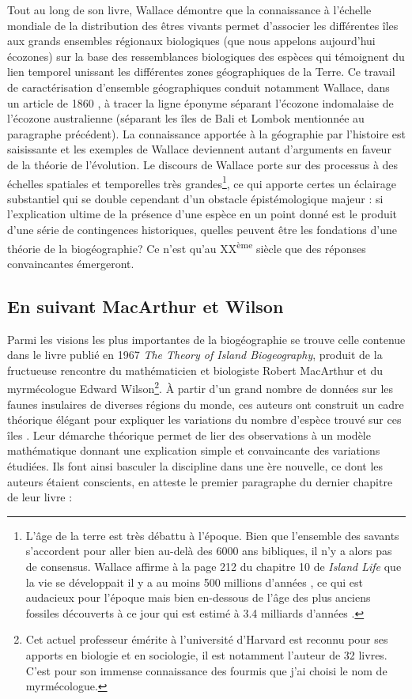 Tout au long de son livre, Wallace démontre que la connaissance à
l'échelle mondiale de la distribution des êtres vivants permet
d'associer les différentes îles aux grands ensembles régionaux
biologiques (que nous appelons aujourd'hui écozones) sur la base des
ressemblances biologiques des espèces qui témoignent du lien temporel
unissant les différentes zones géographiques de la Terre. Ce travail de
caractérisation d'ensemble géographiques conduit notamment Wallace, dans
un article de 1860 \citep{Wallace1860}, à tracer la ligne éponyme
séparant l'écozone indomalaise de l'écozone australienne (séparant les
îles de Bali et Lombok mentionnée au paragraphe précédent). La
connaissance apportée à la géographie par l'histoire est saisissante et
les exemples de Wallace deviennent autant d'arguments en faveur de la
théorie de l'évolution. Le discours de Wallace porte sur des processus à
des échelles spatiales et temporelles très grandes\footnote{L'âge de la
  terre est très débattu à l'époque. Bien que l'ensemble des savants
  s'accordent pour aller bien au-delà des 6000 ans bibliques, il n'y a
  alors pas de consensus. Wallace affirme à la page 212 du chapitre 10
  de \emph{Island Life} que la vie se développait il y a au moins 500
  millions d'années \citep{wallace1881island}, ce qui est audacieux pour
  l'époque mais bien en-dessous de l'âge des plus anciens fossiles
  découverts à ce jour qui est estimé à 3.4 milliards d'années
  \citep{Wacey2011}.}, ce qui apporte certes un éclairage substantiel
qui se double cependant d'un obstacle épistémologique majeur : si
l'explication ultime de la présence d'une espèce en un point donné est
le produit d'une série de contingences historiques, quelles peuvent être
les fondations d'une théorie de la biogéographie? Ce n'est qu'au
XX\textsuperscript{ème} siècle que des réponses convaincantes
émergeront.

\subsection*{En suivant MacArthur et
Wilson}\label{en-suivant-macarthur-et-wilson}

Parmi les visions les plus importantes de la biogéographie se trouve
celle contenue dans le livre publié en 1967 \emph{The Theory of Island
Biogeography}, produit de la fructueuse rencontre du mathématicien et
biologiste Robert MacArthur et du myrmécologue Edward Wilson\footnote{Cet
  actuel professeur émérite à l'université d'Harvard est reconnu pour
  ses apports en biologie et en sociologie, il est notamment l'auteur de
  32 livres. C'est pour son immense connaissance des fourmis que j'ai
  choisi le nom de myrmécologue.}. À partir d'un grand nombre de données
sur les faunes insulaires de diverses régions du monde, ces auteurs ont
construit un cadre théorique élégant pour expliquer les variations du
nombre d'espèce trouvé sur ces îles \citep{MacArthur1967}. Leur démarche
théorique permet de lier des observations à un modèle mathématique
donnant une explication simple et convaincante des variations étudiées.
Ils font ainsi basculer la discipline dans une ère nouvelle, ce dont les
auteurs étaient conscients, en atteste le premier paragraphe du dernier
chapitre de leur livre :

